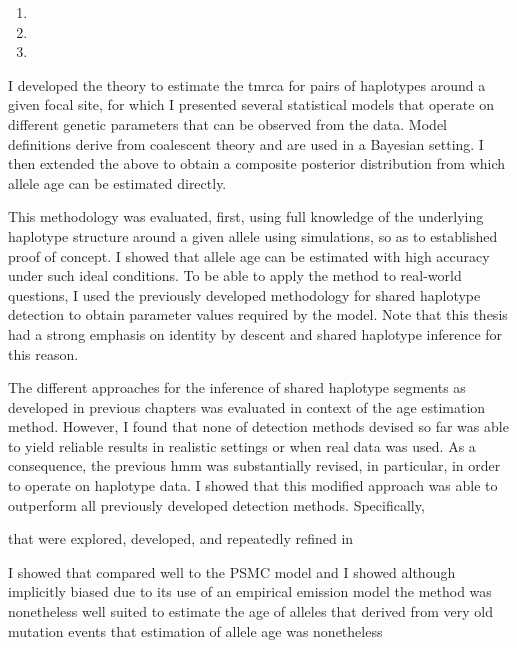 \begin{enumerate}
\item%

\item%

\item%

\end{enumerate}


I developed the theory to estimate the \gls{tmrca} for pairs of haplotypes around a given focal site, for which I presented several statistical models that operate on different genetic parameters that can be observed from the data.
Model definitions derive from coalescent theory and are used in a Bayesian setting.
I then extended the above to obtain a composite posterior distribution from which allele age can be estimated directly.

This methodology was evaluated, first, using full knowledge of the underlying haplotype structure around a given allele using simulations, so as to established proof of concept.
I showed that allele age can be estimated with high accuracy under such ideal conditions.
To be able to apply the method to real-world questions, I used the previously developed methodology for shared haplotype detection to obtain parameter values required by the model.
Note that this thesis had a strong emphasis on identity by descent and shared haplotype inference for this reason.

The different approaches for the inference of shared haplotype segments as developed in previous chapters was evaluated in context of the age estimation method.
However, I found that none of detection methods devised so far was able to yield reliable results in realistic settings or when real data was used.
As a consequence, the previous \gls{hmm} was substantially revised, in particular, in order to operate on haplotype data.
I showed that this modified approach was able to outperform all previously developed detection methods.
Specifically,

that were explored, developed, and repeatedly refined in

I showed that
compared well to the PSMC model
and I showed
although implicitly biased due to its use of an empirical emission model
the method was nonetheless well suited to estimate the age of alleles that derived from very old mutation events
that estimation of allele age was nonetheless









